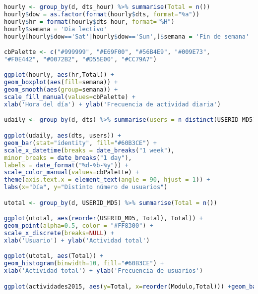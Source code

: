 \begin{lstlisting}[language=r]
hourly <- group_by(d, dts_hour) %>% summarise(Total = n())
hourly$dow = as.factor(format(hourly$dts, format="%a"))
hourly$hr = format(hourly$dts_hour, format="%H")
hourly$semana = 'Dia lectivo'
hourly[hourly$dow=='Sat'|hourly$dow=='Sun',]$semana = 'Fin de semana'

cbPalette <- c("#999999", "#E69F00", "#56B4E9", "#009E73",
"#F0E442", "#0072B2", "#D55E00", "#CC79A7")

ggplot(hourly, aes(hr,Total)) +
geom_boxplot(aes(fill=semana)) +
geom_smooth(aes(group=semana)) +
scale_fill_manual(values=cbPalette) +
xlab('Hora del día') + ylab('Frecuencia de actividad diaria')

udaily <- group_by(d, dts) %>% summarise(users = n_distinct(USERID_MD5))

ggplot(udaily, aes(dts, users)) +
geom_bar(stat="identity", fill="#60B3CE") +
scale_x_datetime(breaks = date_breaks("1 week"),
minor_breaks = date_breaks("1 day"),
labels = date_format("%d-%b-%y")) +
scale_color_manual(values=cbPalette) +
theme(axis.text.x = element_text(angle = 90, hjust = 1)) +
labs(x="Día", y="Distinto número de usuarios")

utotal <- group_by(d, USERID_MD5) %>% summarise(Total = n())

ggplot(utotal, aes(reorder(USERID_MD5, Total), Total)) +
geom_point(alpha=0.5, color = "#FF8300") +
scale_x_discrete(breaks=NULL) +
xlab('Usuario') + ylab('Actividad total')

ggplot(utotal, aes(Total)) +
geom_histogram(binwidth=10, fill="#60B3CE") +
xlab('Actividad total') + ylab('Frecuencia de usuarios')

ggplot(actividades2015, aes(y=Total, x=reorder(Modulo,Total))) +geom_bar(stat="identity", width=0.2)  +theme_minimal() + coord_flip() + labs(x="", y="")

\end{lstlisting}	
	
